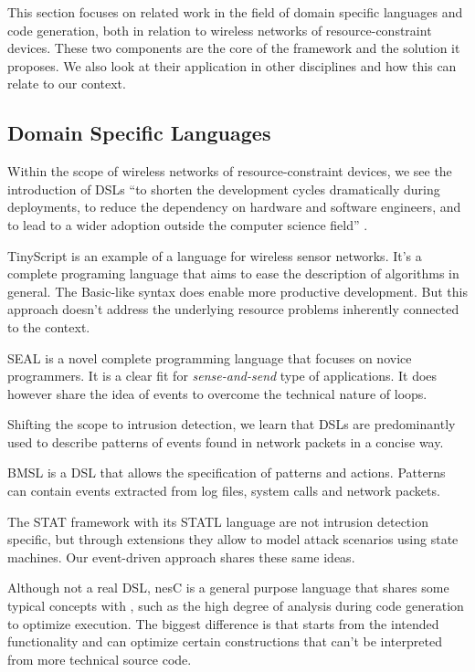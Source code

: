 \documentclass[conference]{IEEEtran}
\begin{document}
This section focuses on related work in the field of domain specific languages
and code generation, both in relation to wireless networks of
resource-constraint devices. These two components are the core of the \NAME
framework and the solution it proposes. We also look at their application in
other disciplines and how this can relate to our context.

\subsection{Domain Specific Languages}

Within the scope of wireless networks of resource-constraint devices, we see
the introduction of DSLs \enquote{to shorten the development cycles
dramatically during deployments, to reduce the dependency on hardware and
software engineers, and to lead to a wider adoption outside the computer
science field} \cite{sadilek2008domain}.

TinyScript \cite{levis2004tinyscript} is an example of a language for wireless
sensor networks. It's a complete programing language that aims to ease the
description of algorithms in general. The Basic-like syntax does enable more
productive development. But this approach doesn't address the underlying
resource problems inherently connected to the context.

SEAL \cite{elsts2013seal} is a novel complete programming language that focuses
on novice programmers. It is a clear fit for \emph{sense-and-send} type of
applications. It does however share the idea of events to overcome the technical
nature of loops.

Shifting the scope to intrusion detection, we learn that DSLs are predominantly
used to describe patterns of events found in network
packets \cite{sekar1999high,roesch1999snort} in a concise way.

BMSL \cite{uppuluri2001experiences} is a DSL that allows the specification of
patterns and actions. Patterns can contain events extracted from log files,
system calls and network packets.

The STAT framework with its STATL language
\cite{eckmann2002statl,vigna2003designing} are not intrusion detection
specific, but through extensions they allow to model attack scenarios using
state machines. Our event-driven approach shares these same ideas.

Although not a real DSL, nesC \cite{gay2003nesc} is a general purpose language
that shares some typical concepts with \NAME, such as the high degree of
analysis during code generation to optimize execution. The biggest difference
is that \NAME starts from the intended functionality and can optimize certain
constructions that can't be interpreted from more technical source code.
\end{document}
